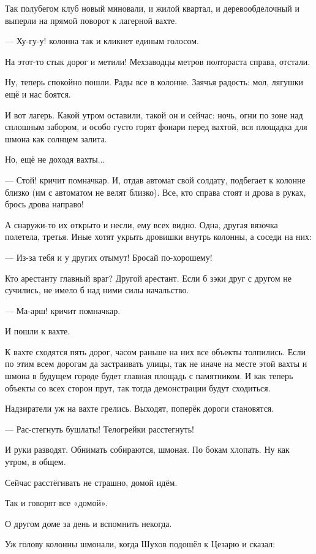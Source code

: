 Так полубегом клуб новый миновали, и жилой квартал, и деревообделочный \dash и выперли на прямой
поворот к лагерной вахте.

--- Ху-гу-у! \dash колонна так и кликнет единым голосом.

На этот-то стык дорог и метили! Мехзаводцы \dash метров полтораста справа, отстали.

Ну, теперь спокойно пошли. Рады все в колонне. Заячья радость: мол, лягушки ещё и нас боятся.

И вот \dash лагерь. Какой утром оставили, такой он и сейчас: ночь, огни по зоне над сплошным
забором, и особо густо горят фонари перед вахтой, вся площадка для шмона как солнцем залита.

Но, ещё не доходя вахты...

--- Стой! \dash кричит помначкар. И, отдав автомат свой солдату, подбегает к колонне близко (им с
автоматом не велят близко). \Dash Все, кто справа стоят и дрова в руках, \dash брось дрова направо!

А снаружи-то их открыто и несли, ему всех видно. Одна, другая вязочка полетела, третья. Иные
хотят укрыть дровишки внутрь колонны, а соседи на них:

--- Из-за тебя и у других отымут! Бросай по-хорошему!

Кто арестанту главный враг? Другой арестант. Если б зэки друг с другом не сучились, не имело б
над ними силы начальство.

--- Ма-арш! \dash кричит помначкар.

И пошли к вахте.

К вахте сходятся пять дорог, часом раньше на них все объекты толпились. Если по этим всем
дорогам да застраивать улицы, так не иначе на месте этой вахты и шмона в будущем городе будет
главная площадь с памятником. И как теперь объекты со всех сторон прут, так тогда
демонстрации будут сходиться.

Надзиратели уж на вахте грелись. Выходят, поперёк дороги становятся.

--- Рас-стегнуть бушлаты! Телогрейки расстегнуть!

И руки разводят. Обнимать собираются, шмоная. По бокам хлопать. Ну как утром, в общем.

Сейчас расстёгивать не страшно, домой идём.

Так и говорят все \dash «домой».

О другом доме за день и вспомнить некогда.

Уж голову колонны шмонали, когда Шухов подошёл к Цезарю и сказал:

